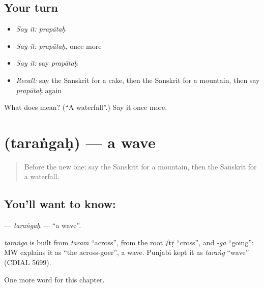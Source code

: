 \subsection*{Your turn}
\begin{itemize}
\raggedright
  \item \emph{Say it:} \emph{prapātaḥ}
  \item \emph{Say it:} \emph{prapātaḥ}, once more
  \item \emph{Say it:} say \emph{prapātaḥ}
  \item \emph{Recall:} say the Sanskrit for a cake, then the Sanskrit for a mountain, then say \emph{prapātaḥ} again
\end{itemize}

\begin{tcolorbox}[breakable,colback=teal!4,colframe=teal!35!black,title={Before you move on}]
What does  mean? (\textquotedblleft{}A waterfall\textquotedblright{}.) Say it once more.
\end{tcolorbox}
\section[\texorpdfstring{\sk{तरंगः} (taraṅgaḥ)}{तरंगः (taraṅgaḥ)}]{ (taraṅgaḥ) — a wave}

\label{lesson:SA-C110-tarangah}



\begin{quote}
Before the new one: say the Sanskrit for a mountain, then the Sanskrit for a waterfall.
\end{quote}

\subsection*{You'll want to know: }
\textbf{} — \emph{taraṅgaḥ} — \textquotedblleft{}a wave\textquotedblright{}.

\begin{cousinweb}
\emph{taraṅga} is built from \emph{taram} \textquotedblleft{}across\textquotedblright{}, from the root √tṝ \textquotedblleft{}cross\textquotedblright{}, and \emph{-ga} \textquotedblleft{}going\textquotedblright{}: MW explains it as \textquotedblleft{}the across-goer\textquotedblright{}, a wave. Punjabi kept it as \emph{taraṅg} \textquotedblleft{}wave\textquotedblright{} (CDIAL 5699).
\end{cousinweb}

\begin{grammarlens}[title={What you've built}]
One more word for this chapter.
\end{grammarlens}

